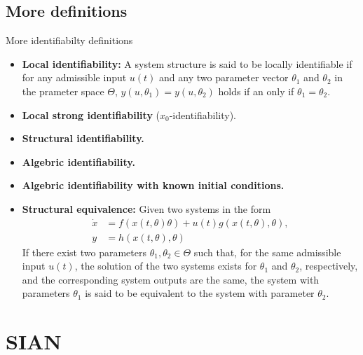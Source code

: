 \documentclass[10pt]{beamer}
\begin{document}
\subsection{More definitions}

\begin{frame}{More identifiabilty definitions}
	\begin{itemize}
		\item \textbf{Local identifiability: } A system structure is said to be locally identifiable if for any admissible input $u(t)$ and any two parameter vector $\theta_1$ and $\theta_2$ in the prameter space $\Theta$, $y(u,\theta_1) = y(u,\theta_2)$ holds if an only if $\theta_1=\theta_2$.
		\item \textbf{Local strong identifiability } ($x_0$-identifiability). 
		\item \textbf{Structural identifiability.} 
		\item \textbf{Algebric identifiability.} 
		\item \textbf{Algebric identifiability with known initial conditions.} 
		\item \textbf{Structural equivalence: } Given two systems in the form
		\begin{subequations}
			\begin{align}
				\dot x &= f(x(t,\theta)\theta) + u(t) g(x(t,\theta), \theta),\\
				y &= h(x(t,\theta),\theta)
			\end{align}
		\end{subequations}
		If there exist two parameters $\theta_1,\theta_2 \in \Theta$ such that, for the same admissible input $u(t)$, the solution of the two systems exists for $\theta_1$ and $\theta_2$, respectively, and the corresponding system outputs are the same, the system with parameters $\theta_1$ is said to be equivalent to the system with parameter $\theta_2$.
	\end{itemize}
	
\end{frame}


\section{SIAN}
\end{document}
